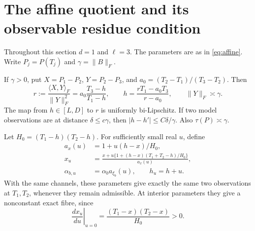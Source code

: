 \section{The affine quotient and its observable residue condition}
\label{sec:residue}
Throughout this section $d=1$ and $\ell=3$. The parameters are as in
\eqref{eq:affine}. Write $P_j=P(T_j)$ and $\gamma=\|B\|_F$.

\begin{lemma}\label{lem:pole}
If $\gamma>0$, put $X=P_1-P_2$, $Y=P_2-P_3$, and
$a_0=(T_2-T_1)/(T_3-T_2)$. Then
\begin{equation}\label{eq:pole}
 r:=\frac{\langle X,Y\rangle_F}{\|Y\|_F^2}
       =a_0\frac{T_3-h}{T_1-h},\qquad
 h=\frac{rT_1-a_0T_3}{r-a_0},\qquad \|Y\|_F\asymp\gamma.
\end{equation}
The map from $h\in[L,D]$ to $r$ is uniformly bi-Lipschitz. If two
model observations are at distance $\delta\le c\gamma$, then
$|h-h'|\le C\delta/\gamma$. Also $\tau(P)\asymp\gamma$.

Let $H_0=(T_1-h)(T_2-h)$. For sufficiently small real $u$, define
\begin{align}
 a_x(u)&=1+u(h-x)/H_0,\nonumber\\
 x_u&=\frac{x+u\{1+(h-x)(T_1+T_2-h)/H_0\}}{a_x(u)},\nonumber\\
 \alpha_{b,u}&=\alpha_b a_{\xi_b}(u),\qquad h_u=h+u.
                                                        \label{eq:gauge}
\end{align}
With the same channels, these parameters give exactly the same two
observations at $T_1,T_2$, whenever they remain admissible. At interior
parameters they give a nonconstant exact fibre, since
\begin{equation}\label{eq:gauge-derivative}
 \left.\frac{d x_u}{du}\right|_{u=0}
                  =\frac{(T_1-x)(T_2-x)}{H_0}>0.
\end{equation}
\end{lemma}
